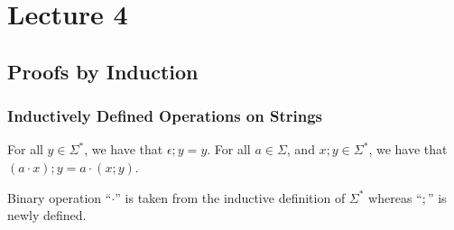 
\section{Lecture 4}
\subsection{Proofs by Induction}

\subsubsection{Inductively Defined Operations on Strings}

\begin{definition}[Concatenation]
  \label{cl4:def:concat}
For all $y \in \Sigma^*$, we have that $\epsilon;y = y$.
For all $a \in \Sigma$, and $x;y \in \Sigma^*$, we have that $(a\cdot x); y = a \cdot (x;y)$.
\end{definition}

\begin{remark} Binary operation ``$\cdot$'' is taken from the inductive definition of $\Sigma^*$ whereas ``$;$'' is newly defined.
\end{remark}

